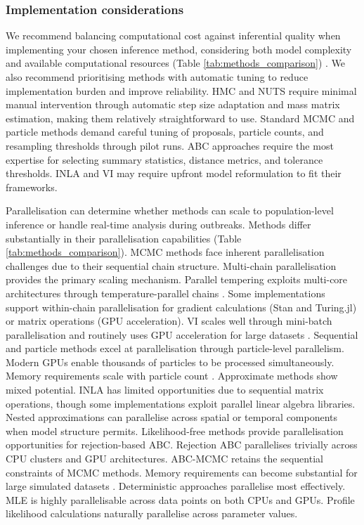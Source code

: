 \documentclass{article}
\begin{document}
\subsubsection{Implementation considerations}

We recommend balancing computational cost against inferential quality when implementing your chosen inference method, considering both model complexity and available computational resources (Table \ref{tab:methods_comparison}) \citep{funk2020choices}.
We also recommend prioritising methods with automatic tuning to reduce implementation burden and improve reliability.
HMC and NUTS require minimal manual intervention through automatic step size adaptation and mass matrix estimation, making them relatively straightforward to use.
Standard MCMC and particle methods demand careful tuning of proposals, particle counts, and resampling thresholds through pilot runs.
ABC approaches require the most expertise for selecting summary statistics, distance metrics, and tolerance thresholds.
INLA and VI may require upfront model reformulation to fit their frameworks.

Parallelisation can determine whether methods can scale to population-level inference or handle real-time analysis during outbreaks.
Methods differ substantially in their parallelisation capabilities (Table \ref{tab:methods_comparison}).
MCMC methods face inherent parallelisation challenges due to their sequential chain structure.
Multi-chain parallelisation provides the primary scaling mechanism.
Parallel tempering exploits multi-core architectures through temperature-parallel chains \citep{surjanovic2023pigeons}.
Some implementations support within-chain parallelisation for gradient calculations (Stan and Turing.jl) or matrix operations (GPU acceleration).
VI scales well through mini-batch parallelisation and routinely uses GPU acceleration for large datasets \citep{hoffman2013stochastic, Abbott2021-delta}.
Sequential and particle methods excel at parallelisation through particle-level parallelism.
Modern GPUs enable thousands of particles to be processed simultaneously.
Memory requirements scale with particle count \citep{henriksen2012parallel}.
Approximate methods show mixed potential.
INLA has limited opportunities due to sequential matrix operations, though some implementations exploit parallel linear algebra libraries.
Nested approximations can parallelise across spatial or temporal components when model structure permits.
Likelihood-free methods provide parallelisation opportunities for rejection-based ABC.
Rejection ABC parallelises trivially across CPU clusters and GPU architectures.
ABC-MCMC retains the sequential constraints of MCMC methods.
Memory requirements can become substantial for large simulated datasets \citep{kulkarni2022hardware}.
Deterministic approaches parallelise most effectively.
MLE is highly parallelisable across data points on both CPUs and GPUs.
Profile likelihood calculations naturally parallelise across parameter values.
\end{document}
